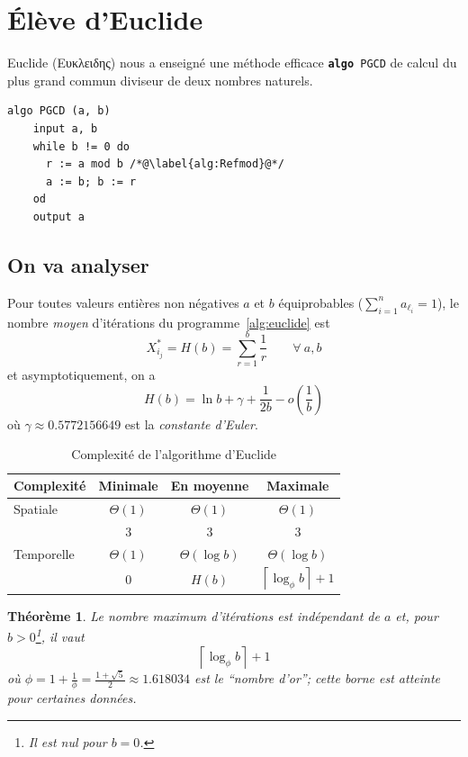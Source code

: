 \documentclass[a4paper,twoside,10pt,english,french]{article}   %
\newcommand{\mymarginpar}[1]{%
  \marginpar[\raggedleft\footnotesize#1]{\raggedright\footnotesize#1}
}
\newcommand{\cpp}{\mymarginpar{\fbox{\large\ttfamily C++}}}
\theoremstyle{definition}
\theoremstyle{remark}
\theoremstyle{plain}
\newtheorem{theoreme}{Théorème}[section]
\begin{document}
\section{Élève d'Euclide}

Euclide (Ευκλειδης) nous a enseigné une méthode efficace \texttt{\textbf{algo} PGCD} de calcul du plus grand commun diviseur de deux nombres naturels.\cpp
\begin{lstlisting}[style=Cext,caption={Algorithme d'Euclide},label={alg:euclide}]
  algo PGCD (a, b)
    input a, b
    while b != 0 do
      r := a mod b /*@\label{alg:Refmod}@*/
      a := b; b := r
    od
    output a
\end{lstlisting}

\subsection{On va analyser}

Pour toutes valeurs entières non négatives $a$ et $b$ équiprobables ($\sum_{i=1}^n a_{\ell_i} = 1$), le nombre
\emph{moyen} d'itérations du programme~\ref{alg:euclide} est
  \[ X_{i_j}^* = H(b) = \sum_{r=1}^b \frac{1}{r} \qquad \forall\ a, b \]
et asymptotiquement, on a
  \[ H(b) = \ln b + \gamma + \frac{1}{2b} - o(\frac{1}{b}) \]
où $\gamma\approx0.5772156649$ est la \emph{constante d'Euler}.

\begin{table}[htb]
  \caption{Complexité de l'algorithme d'Euclide}
  \centering
  \begin{tabular}{l|ccc}
    Complexité & Minimale         & En moyenne       & Maximale         \\
    \hline
    Spatiale   & $\Theta(1)$      & $\Theta(1)$      & $\Theta(1)$      \\
               & $3$              & $3$              & $3$              \\
    \hline
    Temporelle & $\Theta(1)$      & $\Theta(\log b)$ & $\Theta(\log b)$ \\
               & $0$              & $H(b)$           &
                             $\left\lceil \log_\phi b \right\rceil + 1$ \\
  \end{tabular}
\end{table}

\begin{theoreme}
  Le nombre \emph{maximum} d'itérations est indépendant de $a$ et, pour $b>0$\footnote{Il est nul pour $b=0$.}, il vaut
  \[ \left\lceil \log_\phi b \right\rceil + 1 \]
  où $\phi=1+\frac{1}{\phi}=\frac{1+\sqrt{5}}{2}\approx1.618034$ est le \enquote{nombre d'or}; cette borne est atteinte pour certaines données.
\end{theoreme}
\end{document}

